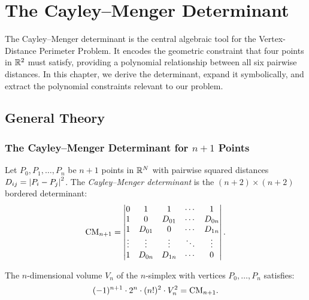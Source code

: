 
\chapter{The Cayley--Menger Determinant}
\label{ch:cayley-menger}

The Cayley--Menger determinant is the central algebraic tool for the Vertex-Distance Perimeter Problem. It encodes the geometric constraint that four points in $\mathbb{R}^2$ must satisfy, providing a polynomial relationship between all six pairwise distances. In this chapter, we derive the determinant, expand it symbolically, and extract the polynomial constraints relevant to our problem.

\section{General Theory}

\subsection{The Cayley--Menger Determinant for $n+1$ Points}

\begin{definition}
\label{def:cayley-menger}
Let $P_0, P_1, \ldots, P_n$ be $n+1$ points in $\mathbb{R}^N$ with pairwise squared distances $D_{ij} = \left\lvert P_i - P_j \right\rvert^2$. The \emph{Cayley--Menger determinant} is the $(n+2) \times (n+2)$ bordered determinant:
\begin{equation}
\mathrm{CM}_{n+1} = \begin{vmatrix}
0 & 1 & 1 & \cdots & 1 \\
1 & 0 & D_{01} & \cdots & D_{0n} \\
1 & D_{01} & 0 & \cdots & D_{1n} \\
\vdots & \vdots & \vdots & \ddots & \vdots \\
1 & D_{0n} & D_{1n} & \cdots & 0
\end{vmatrix}.
\end{equation}
\end{definition}

\begin{theorem}
\label{thm:volume-formula}
The $n$-dimensional volume $V_n$ of the $n$-simplex with vertices $P_0, \ldots, P_n$ satisfies:
\begin{equation}
\label{eq:volume-cm}
(-1)^{n+1} \cdot 2^n \cdot (n!)^2 \cdot V_n^2 = \mathrm{CM}_{n+1}.
\end{equation}
\end{theorem}

